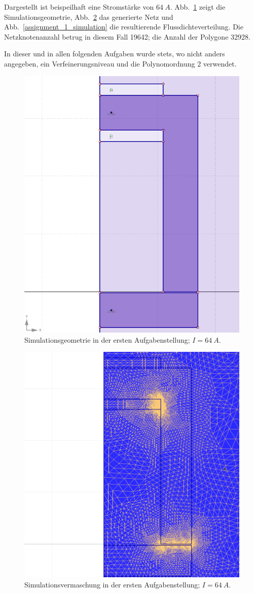 \documentclass[conference,a4paper,twoside]{IEEEtran}
\begin{document}
Dargestellt ist beispeilhaft eine Stromstärke von $64\ A$. Abb.~\ref{assignment_1_geometry} zeigt die Simulationsgeometrie, Abb.~\ref{assignment_1_mesh} das generierte Netz und Abb.~\ref{assignment_1_simulation} die resultierende Flussdichteverteilung. Die Netzknotenanzahl betrug in diesem Fall 19642; die Anzahl der Polygone 32928.

In dieser und in allen folgenden Aufgaben wurde stets, wo nicht anders angegeben, ein Verfeinerungsniveau und die Polynomordnung 2 verwendet.

\begin{figure}
\centerline{\includegraphics[width=0.7\columnwidth]{../assets/assignment_1_geometry.png}}
\caption{Simulationsgeometrie in der ersten Aufgabenstellung; $I = 64\ A$.}
\label{assignment_1_geometry}
\end{figure}

\begin{figure}
\centerline{\includegraphics[width=0.7\columnwidth]{../assets/assignment_1_mesh.png}}
\caption{Simulationsvermaschung in der ersten Aufgabenstellung; $I = 64\ A$.}
\label{assignment_1_mesh}
\end{figure}
\end{document}
